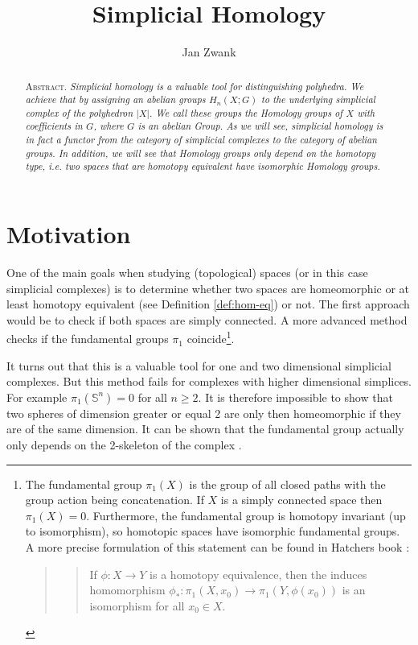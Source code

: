 \documentclass[draft,toc=bib]{scrartcl}
\title{Simplicial Homology}
\author{Jan Zwank}
\theoremstyle{plain}
\theoremstyle{definition}
\theoremstyle{remark}
\newcommand{\scs}{simplicial complexes}
\begin{document}
	\maketitle
	
	\begin{abstract}
		\textsc{Abstract.}\textit{
		Simplicial homology is a valuable tool for distinguishing polyhedra. We achieve that by assigning an abelian groups $H_n(X;G)$ to the underlying simplicial complex of the polyhedron $|X|$. We call these groups the Homology groups of $X$ with coefficients in $G$, where $G$ is an abelian Group. As we will see, simplicial homology is in fact a functor from the category of simplicial complexes to the category of abelian groups. In addition, we will see that Homology groups only depend on the homotopy type, i.e. two spaces that are homotopy equivalent have isomorphic Homology groups.
		}
	\end{abstract}
\clearpage
\tableofcontents

\clearpage

\section{Motivation}\label{motivation}
One of the main goals when studying (topological) spaces (or in this case \scs) is to determine whether two spaces are homeomorphic or at least homotopy equivalent (see Definition \ref{def:hom-eq}) 
or not. The first approach would be to check if both spaces are simply connected. A more advanced method checks if the fundamental groups $\pi_1$ coincide\footnote{The fundamental group $\pi_1(X)$ is the group of all closed paths with the group action being concatenation. If $X$ is a simply connected space then $\pi_1(X)=0$. Furthermore, the fundamental group is homotopy invariant (up to isomorphism), so homotopic spaces have isomorphic fundamental groups. A more precise formulation of this statement can be found in Hatchers book \parencite[Prop. 1.18, p. 37]{ha}:
\begin{quotation}
	\begin{quote}
		If $\phi: X\to Y$ is a homotopy equivalence, then the induces homomorphism $\phi_*:\pi_1(X,x_0)\to\pi_1(Y,\phi(x_0))$ is an isomorphism for all $x_0\in X$.
	\end{quote}
\end{quotation} }.

It turns out that this is a valuable tool for one and two dimensional \scs. But this method fails for complexes with higher dimensional simplices. For example $\pi_1(\mathbb{S}^n)=0$ for all $n\geq 2$. It is therefore impossible to show that two spheres of dimension greater or equal 2 are only then homeomorphic if they are of the same dimension. It can be shown that the fundamental group actually only depends on the 2-skeleton of the complex \cite[vgl.][p. 173]{ar}. 
\end{document}
